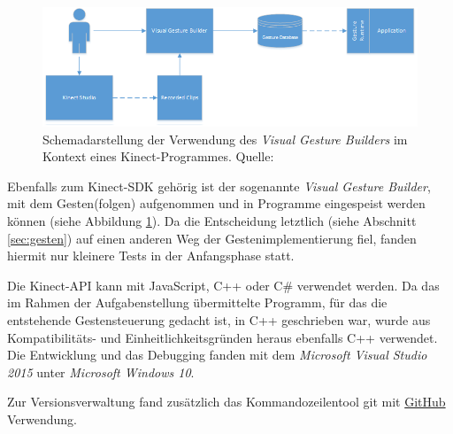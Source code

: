 	\par
	\begin{figure}[H]
	\centering
	\includegraphics[width=\textwidth]{pictures/vgb.png}
	\caption{Schemadarstellung der Verwendung des \emph{Visual Gesture Builders} im Kontext eines Kinect-Programmes. Quelle: \cite{vgb}}\label{fig:vgb}
	\end{figure}
	Ebenfalls zum Kinect-SDK gehörig ist der sogenannte \emph{Visual Gesture Builder}, mit dem Gesten(folgen) aufgenommen und in Programme eingespeist werden können (siehe Abbildung \ref{fig:vgb}).
	Da die Entscheidung letztlich (siehe Abschnitt \ref{sec:gesten}) auf einen anderen Weg der Gestenimplementierung fiel, fanden hiermit nur kleinere Tests in der Anfangsphase statt.\par 
	Die Kinect-API kann mit JavaScript, C++ oder C\# verwendet werden. Da das im Rahmen der Aufgabenstellung übermittelte Programm, für das die entstehende Gestensteuerung gedacht ist, in C++ geschrieben war, wurde aus Kompatibilitäts- und Einheitlichkeitsgründen heraus ebenfalls C++ verwendet. Die Entwicklung und das Debugging fanden mit dem \emph{Microsoft Visual Studio 2015} unter \emph{Microsoft Windows 10}.\par 
	Zur Versionsverwaltung fand zusätzlich das Kommandozeilentool git mit \href{http://github.com}{GitHub} Verwendung.\par 
